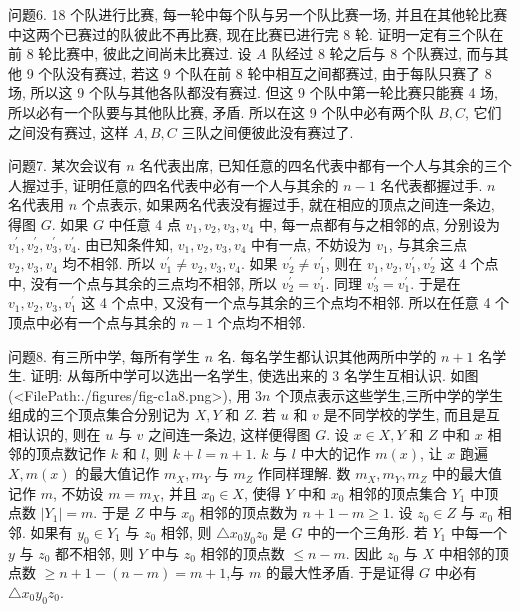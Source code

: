 问题6. 18 个队进行比赛, 每一轮中每个队与另一个队比赛一场, 并且在其他轮比赛中这两个已赛过的队彼此不再比赛, 现在比赛已进行完 8 轮.
证明一定有三个队在前 8 轮比赛中, 彼此之间尚未比赛过.
设 $A$ 队经过 8 轮之后与 8 个队赛过, 而与其他 9 个队没有赛过, 若这 9 个队在前 8 轮中相互之间都赛过, 由于每队只赛了 8 场, 所以这 9 个队与其他各队都没有赛过.
但这 9 个队中第一轮比赛只能赛 4 场, 所以必有一个队要与其他队比赛, 矛盾.
所以在这 9 个队中必有两个队 $B, C$, 它们之间没有赛过, 这样 $A, B, C$ 三队之间便彼此没有赛过了.



问题7. 某次会议有 $n$ 名代表出席, 已知任意的四名代表中都有一个人与其余的三个人握过手, 证明任意的四名代表中必有一个人与其余的 $n-1$ 名代表都握过手.
$n$ 名代表用 $n$ 个点表示, 如果两名代表没有握过手, 就在相应的顶点之间连一条边, 得图 $G$. 如果 $G$ 中任意 4 点 $v_1, v_2, v_3, v_4$ 中, 每一点都有与之相邻的点, 分别设为 $v_1^{\prime}, v_2^{\prime}, v_3^{\prime}, v_4^{\prime}$. 由已知条件知, $v_1, v_2, v_3, v_4$ 中有一点, 不妨设为 $v_1$, 与其余三点 $v_2, v_3, v_4$ 均不相邻.
所以 $v_1^{\prime} \neq v_2, v_3, v_4$. 如果 $v_2^{\prime} \neq v_1^{\prime}$, 则在 $v_1, v_2, v_1^{\prime}, v_2^{\prime}$ 这 4 个点中, 没有一个点与其余的三点均不相邻, 所以 $v_2^{\prime}=v_1^{\prime}$. 同理 $v_3^{\prime}=v_1^{\prime}$. 于是在 $v_1, v_2, v_3, v_1^{\prime}$ 这 4 个点中, 又没有一个点与其余的三个点均不相邻.
所以在任意 4 个顶点中必有一个点与其余的 $n-1$ 个点均不相邻.



问题8. 有三所中学, 每所有学生 $n$ 名.
每名学生都认识其他两所中学的 $n+1$ 名学生.
证明: 从每所中学可以选出一名学生, 使选出来的 3 名学生互相认识.
如图(<FilePath:./figures/fig-c1a8.png>), 用 $3 n$ 个顶点表示这些学生,三所中学的学生组成的三个顶点集合分别记为 $X, Y$ 和 $Z$. 若 $u$ 和 $v$ 是不同学校的学生, 而且是互相认识的, 则在 $u$ 与 $v$ 之间连一条边, 这样便得图 $G$. 设 $x \in X, Y$ 和 $Z$ 中和 $x$ 相邻的顶点数记作 $k$ 和 $l$, 则 $k+l=n+1$. $k$ 与 $l$ 中大的记作 $m(x)$, 让 $x$ 跑遍 $X, m(x)$ 的最大值记作 $m_X, m_Y$ 与 $m_Z$ 作同样理解.
数 $m_X, m_Y, m_Z$ 中的最大值记作 $m$, 不妨设 $m=m_X$, 并且 $x_0 \in X$,
使得 $Y$ 中和 $x_0$ 相邻的顶点集合 $Y_1$ 中顶点数 $\left|Y_1\right|=m$. 于是 $Z$ 中与 $x_0$ 相邻的顶点数为 $n+1-m \geqslant 1$. 设 $z_0 \in Z$ 与 $x_0$ 相邻.
如果有 $y_0 \in Y_1$ 与 $z_0$ 相邻, 则 $\triangle x_0 y_0 z_0$ 是 $G$ 中的一个三角形.
若 $Y_1$ 中每一个 $y$ 与 $z_0$ 都不相邻, 则 $Y$ 中与 $z_0$ 相邻的顶点数 $\leqslant n-m$. 因此 $z_0$ 与 $X$ 中相邻的顶点数 $\geqslant n+1-(n-m)= m+1$,与 $m$ 的最大性矛盾.
于是证得 $G$ 中必有 $\triangle x_0 y_0 z_0$.



